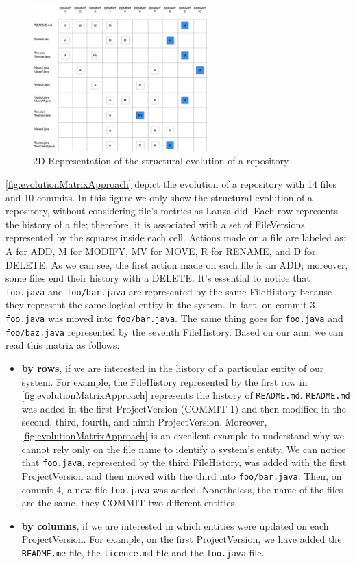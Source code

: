 \begin{figure}
    \center
    \includegraphics[width=0.6\textwidth]{2DMatrix.jpg}
    \caption{2D Representation of the structural evolution of a repository}
    \label{fig:evolutionMatrixApproach}
\end{figure}
\autoref{fig:evolutionMatrixApproach} depict the evolution of a repository with 14 files and 10 commits. In this figure we only show the structural evolution of a repository, without considering file's metrics as Lanza did. 
Each row represents the history of a file; therefore, it is associated with a set of FileVersions represented by the squares inside each cell. Actions made on a file are labeled as: A for ADD, M for MODIFY, MV for MOVE, R for RENAME, and D for DELETE.
As we can see, the first action made on each file is an ADD; moreover, some files end their history with a DELETE. It's essential to notice that \texttt{foo.java} and \texttt{foo/bar.java} are represented by the same FileHistory because they represent the same logical entity in the system. In fact, on commit 3 \texttt{foo.java} was moved into \texttt{foo/bar.java}. The same thing goes for \texttt{foo.java} and \texttt{foo/baz.java} represented by the seventh FileHistory.
\bigbreak 
Based on our aim, we can read this matrix as follows:
 \begin{itemize}
     \item \textbf{by rows}, if we are interested in the history of a particular entity of our system. 
     For example, the FileHistory represented by the first row in \autoref{fig:evolutionMatrixApproach} represents the history of \texttt{README.md}. 
     \texttt{README.md} was added in the first ProjectVersion (COMMIT 1) and then modified in the second, third, fourth, and ninth ProjectVersion.
     Moreover, \autoref{fig:evolutionMatrixApproach} is an excellent example to understand why we cannot rely only on the file name to identify a system's entity. 
     We can notice that \texttt{foo.java}, represented by the third FileHistory, was added with the first ProjectVersion and then moved with the third into \texttt{foo/bar.java}. 
     Then, on commit 4, a new file \texttt{foo.java} was added. Nonetheless, the name of the files are the same, they COMMIT two different entities. 
     \item \textbf{by columns}, if we are interested in which entities were updated on each ProjectVersion. 
    For example, on the first ProjectVersion, we have added the \texttt{README.me} file, the \texttt{licence.md} file and the \texttt{foo.java} file. 
 \end{itemize}

